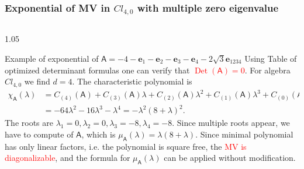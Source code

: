 \documentclass[xcolor=table,hyperref={pdfpagemode=FullScreen}]{beamer}
\newcommand{\cl}[2]{\ensuremath{\mathit{Cl}_{#1,#2}}} %
\newcommand{\e}[1]{\mathbf{e}_{#1}} %
\def\m#1{\mathsf{#1}} %
\def\m#1{\mathsf{#1}}%
\DeclareMathOperator{\Det}{Det} %
\newcommand{\red}[1]{\textcolor{red}{#1}}
\begin{document}
\begin{frame}
\frametitle<presentation>{Exponential of MV in \cl{4}{0} with multiple zero eigenvalue}
\vskip -10pt
\begin{columns}[t]
\begin{column}{1.05\textwidth}
 \begin{block}{Example of exponential of $\m{A}=-4-\e{1}-\e{2}-\e{3}-\e{4}-2 \sqrt{3} \e{1234}$}
  Using Table of optimized determinant formulas one can verify that \red{$\Det(\m{A})=0$}.
For algebra $\cl{4}{0}$ we find $d=4$. The characteristic
  polynomial is 
 \begin{equation*}
 \begin{split}
   \chi_{\m{A}}(\lambda)&=C_{(4)}(\m{A})+C_{(3)}(\m{A})
\lambda+C_{(2)}(\m{A})\lambda^2+C_{(1)}(\m{A})
   \lambda^3+C_{(0)}(\m{A})\lambda^4\\
   &
 = -64 \lambda^2-16 \lambda^3-\lambda^4 = -\lambda^2 (8+\lambda)^2.
 \end{split}
 \end{equation*}
The roots are $\lambda_1=0, \lambda_2=0, \lambda_3=-8, \lambda_4=-8$. Since multiple roots appear,  we have to compute \hyperlink{MinimalPolynomial}{}
 of $\m{A}$,
which is $\mu_{\m{A}}(\lambda)=\lambda (8 + \lambda)$. Since
minimal polynomial has only linear factors, i.e. the polynomial is square
  free, the \red{MV is diagonalizable}, and the formula for
$\mu_{\m{A}}(\lambda)$  can be applied without modification.
 \end{block}
\end{column}
\end{columns}
\end{frame}
\end{document}

